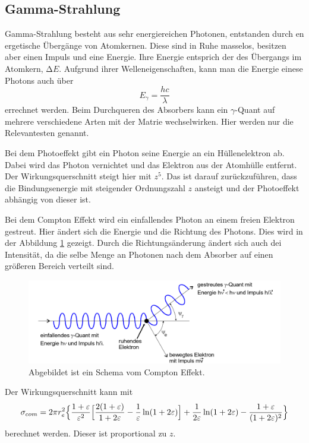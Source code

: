 \subsection{Gamma-Strahlung}
Gamma-Strahlung besteht aus sehr energiereichen Photonen, entstanden durch en ergetische Übergänge von Atomkernen.
Diese sind in Ruhe masselos, besitzen aber einen Impuls und eine Energie.
Ihre Energie entsprich der des Übergangs im Atomkern, $\increment E$. 
Aufgrund ihrer Welleneigenschaften, kann man die Energie einese Photons auch über
\begin{equation*}
    E_\gamma=\frac{h c}{\lambda}
\end{equation*}
errechnet werden.
Beim Durchqueren des Absorbers kann ein $\gamma$-Quant auf mehrere verschiedene Arten mit der Matrie wechselwirken.
Hier werden nur die Relevantesten genannt.  

Bei dem Photoeffekt gibt ein Photon seine Energie an ein Hüllenelektron ab.
Dabei wird das Photon vernichtet und das Elektron aus der Atomhülle entfernt.
Der Wirkungsquerschnitt steigt hier mit $z^5$.
Das ist darauf zurückzuführen, dass die Bindungsenergie mit steigender Ordnungszahl $z$ ansteigt und der Photoeffekt abhängig von dieser ist.  


Bei dem Compton Effekt wird ein einfallendes Photon an einem freien Elektron gestreut.
Hier ändert sich die Energie und die Richtung des Photons.
Dies wird in der Abbildung \ref{fig:Compton} gezeigt.
Durch die Richtungsänderung ändert sich auch dei Intensität, da die selbe Menge an Photonen nach dem Absorber auf einen größeren Bereich verteilt sind.

\begin{figure}[H]
    \centering
    \includegraphics[width=\textwidth]{Bilder/Compton.png}
    \caption{Abgebildet ist ein Schema vom Compton Effekt.}
    \label{fig:Compton}
\end{figure}

\noindent Der Wirkungsquerschnitt kann mit
\begin{equation}
    \sigma_{com}=2 \pi r_e^2 \Bigl\{ \frac{1+\varepsilon}{\varepsilon^2}\Bigl[ \frac{2(1+\varepsilon)}{1+2 \varepsilon}-\frac{1}{\varepsilon} \ln(1+2 \varepsilon)\Bigr]
    +\frac{1}{2 \varepsilon} \ln(1+2 \varepsilon)-\frac{1+\varepsilon}{(1+2\varepsilon)^2}\Bigr\}
    \label{eqn:Compton}
\end{equation}
berechnet werden.
Dieser ist proportional zu $z$.  

